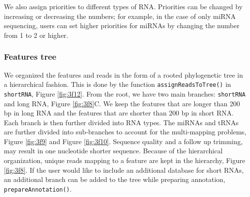 \documentclass[12pt,twoside]{reedthesis}
\newenvironment{Shaded}{\begin{snugshade}}{\end{snugshade}}
\newcommand{\DecValTok}[1]{\textcolor[rgb]{0.00,0.00,0.81}{#1}}
\newcommand{\NormalTok}[1]{#1}
\newcommand{\SpecialCharTok}[1]{\textcolor[rgb]{0.00,0.00,0.00}{#1}}
\begin{document}
We also assign priorities to different types of RNA. Priorities can be
changed by increasing or decreasing the numbers; for example, in the
case of only miRNA sequencing, users can set higher priorities for
miRNAs by changing the number from 1 to 2 or higher.
\begin{Shaded}
\end{Shaded}
\hypertarget{ft}{%
\subsubsection{Features tree}\label{ft}}

We organized the features and reads in the form of a rooted phylogenetic
tree in a hierarchical fashion. This is done by the function
\texttt{assignReadsToTree()} in \texttt{shortRNA}, Figure \ref{fig:3f12}. From the root, we have two
main branches: \texttt{shortRNA} and long RNA, Figure \ref{fig:3f8}C. We keep the features
that are longer than 200 bp in long RNA and the features that are
shorter than 200 bp in short RNA. Each branch is then further divided
into RNA types. The miRNAs and tRNAs are further divided into
sub-branches to account for the multi-mapping problems, Figure \ref{fig:3f9} and
Figure \ref{fig:3f10}. Sequence quality and a follow up trimming, may result in one
nucleotide shorter sequence. Because of the hierarchical organization,
unique reads mapping to a feature are kept in the hierarchy, Figure \ref{fig:3f8}.
If the user would like to include an additional database for short RNAs,
an additional branch can be added to the tree while preparing
annotation, \texttt{prepareAnnotation()}.
\end{document}
